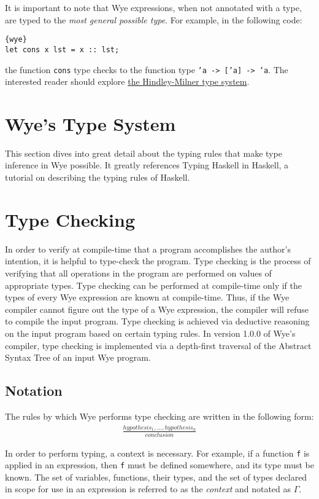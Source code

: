 \documentclass[a4paper, 12pt]{article}
\newcommand{\version}{1.0.0}
\begin{document}
It is important to note that Wye expressions, when not annotated with a type, are typed to the \textit{most general possible type}. For example, in the following code:
\begin{lstlisting}{wye}
let cons x lst = x :: lst;
\end{lstlisting}
the function \texttt{cons} type checks to the function type \texttt{'a -> ['a] -> 'a}. The interested reader should explore \href{{https://en.wikipedia.org/wiki/Hindley%

\section{Wye's Type System}

This section dives into great detail about the typing rules that make type inference in Wye possible. It greatly references Typing Haskell in Haskell, a tutorial on describing the typing rules of Haskell.

\newpage
\section{Type Checking}

In order to verify at compile-time that a program accomplishes the author's intention, it is helpful to type-check the program. Type checking is the process of verifying that all operations in the program are performed on values of appropriate types. Type checking can be performed at compile-time only if the types of every Wye expression are known at compile-time. Thus, if the Wye compiler cannot figure out the type of a Wye expression, the compiler will refuse to compile the input program. Type checking is achieved via deductive reasoning on the input program based on certain typing rules. In version \version{} of Wye's compiler, type checking is implemented via a depth-first traversal of the Abstract Syntax Tree of an input Wye program.

\subsection{Notation}

The rules by which Wye performs type checking are written in the following form:
\begin{align*}
\frac{hypothesis_1, ..., hypothesis_n}{conclusion}
\end{align*}

In order to perform typing, a context is necessary. For example, if a function \texttt{f} is applied in an expression, then \texttt{f} must be defined somewhere, and its type must be known. The set of variables, functions, their types, and the set of types declared in scope for use in an expression is referred to as the \textit{context} and notated as $\Gamma$.
\end{document}
